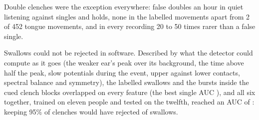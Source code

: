 Double clenches were the exception everywhere: \clListenDouble{} false doubles an hour in quiet listening against \clListenOthers{} singles and holds, none in the labelled movements apart from 2 of 452 tongue movements, and in every recording 20 to 50 times rarer than a false single.

Swallows could not be rejected in software. Described by what the detector could compute as it goes (the weaker ear's peak over its background, the time above half the peak, slow potentials during the event, upper against lower contacts, spectral balance and symmetry), the \clSwallowN{} labelled swallows and the \clClenchBursts{} bursts inside the cued clench blocks overlapped on every feature (the best single AUC \clSwallowBest{}), and all six together, trained on eleven people and tested on the twelfth, reached an AUC of \clSwallowAuc{}: keeping 95\% of clenches would have rejected \clSwallowKeep{} of swallows.

